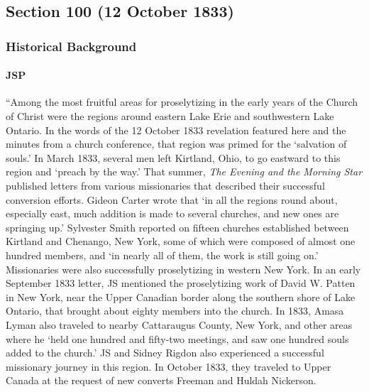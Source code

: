 \subsection{Section 100 (12 October 1833)}
	\label{DC100}
	
	\subsubsection{Historical Background}
		\label{DC100-HB}
		
		\paragraph{JSP}
		
			``Among the most fruitful areas for proselytizing in the early years of the Church of Christ were the regions around eastern Lake Erie and southwestern Lake Ontario. In the words of the 12 October 1833 revelation featured here and the minutes from a church conference, that region was primed for the `salvation of souls.' In March 1833, several men left Kirtland, Ohio, to go eastward to this region and `preach by the way.' That summer, \textit{The Evening and the Morning Star} published letters from various missionaries that described their successful conversion efforts. Gideon Carter wrote that `in all the regions round about, especially east, much addition is made to several churches, and new ones are springing up.' Sylvester Smith reported on fifteen churches established between Kirtland and Chenango, New York, some of which were composed of almost one hundred members, and `in nearly all of them, the work is still going on.' Missionaries were also successfully proselytizing in western New York. In an early September 1833 letter, JS mentioned the proselytizing work of David W. Patten in New York, near the Upper Canadian border along the southern shore of Lake Ontario, that brought about eighty members into the church. In 1833, Amasa Lyman also traveled to nearby Cattaraugus County, New York, and other areas where he `held one hundred and fifty-two meetings, and saw one hundred souls added to the church.' JS and Sidney Rigdon also experienced a successful missionary journey in this region. In October 1833, they traveled to Upper Canada at the request of new converts Freeman and Huldah Nickerson.
			
